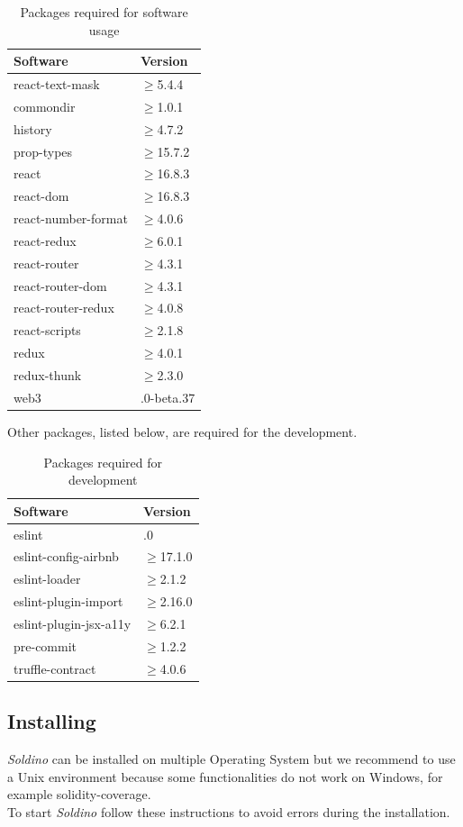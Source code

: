 \renewcommand{\arraystretch}{1.5}
\begin{longtable}{ 
		>{\centering}p{} 
		>{\centering}p{}
	}
	\caption{Packages required for software usage}\\
	\rowcolorhead
	\textbf{\color{white}Software} & 
	\textbf{\color{white}Version}
	\tabularnewline  
	\endhead	
	


	react-text-mask & $\geq$5.4.4
	\tabularnewline
	commondir &$\geq$1.0.1
	\tabularnewline
	history &$\geq$4.7.2
	\tabularnewline
	prop-types &$\geq$15.7.2\tabularnewline
	react &$\geq$16.8.3\tabularnewline
	react-dom &$\geq$16.8.3\tabularnewline
	react-number-format &$\geq$4.0.6\tabularnewline
	react-redux &$\geq$6.0.1\tabularnewline
	react-router &$\geq$4.3.1\tabularnewline
	react-router-dom &$\geq$4.3.1\tabularnewline
	react-router-redux &$\geq$4.0.8\tabularnewline
	react-scripts &$\geq$2.1.8\tabularnewline
	redux &$\geq$4.0.1\tabularnewline
	redux-thunk &$\geq$2.3.0\tabularnewline
	web3 & 1.0.0-beta.37\tabularnewline
	
\end{longtable}

Other packages, listed below, are required for the development.
\renewcommand{\arraystretch}{1.5}
\begin{longtable}{ 
		>{\centering}p{} 
		>{\centering}p{}
	}
	\caption{Packages required for development}\\
	\rowcolorhead
	\textbf{\color{white}Software} & 
	\textbf{\color{white}Version}
	\tabularnewline  
	\endhead	
	
	eslint & 5.12.0\tabularnewline
	eslint-config-airbnb &$\geq$17.1.0\tabularnewline
	eslint-loader & $\geq$2.1.2\tabularnewline
	eslint-plugin-import & $\geq$2.16.0\tabularnewline
	eslint-plugin-jsx-a11y & $\geq$6.2.1\tabularnewline
	pre-commit & $\geq$1.2.2\tabularnewline
	truffle-contract & $\geq$4.0.6\tabularnewline
	
\end{longtable}

\subsection{Installing}
\textit{Soldino} can be installed on multiple Operating System but we recommend to use a 
Unix environment because some functionalities do not work on Windows, for example solidity-coverage.\\
To start \textit{Soldino} follow these instructions to avoid errors during the installation.
